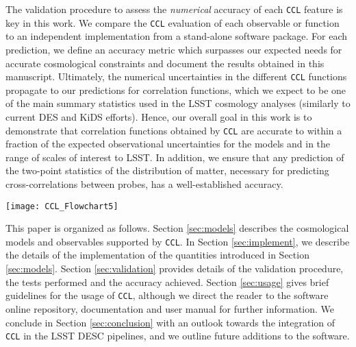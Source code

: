 \documentclass[\docopts]{\docclass}
\newcommand{\ccl}{{\tt CCL}\xspace}
\newcommand{\class}{{\tt CLASS}\xspace}
\begin{document}
The validation procedure to assess the {\it numerical} accuracy of each \ccl feature is key in this work. We compare the \ccl evaluation of each observable or function to an independent implementation from a stand-alone software package. For each prediction, we define an accuracy metric which surpasses our expected needs for accurate cosmological constraints and document the results obtained in this manuscript. Ultimately, the numerical uncertainties in the different \ccl functions propagate to our predictions for correlation functions, which we expect to be one of the main summary statistics used in the LSST cosmology analyses (similarly to current DES and KiDS efforts). Hence, our overall goal in this work is to demonstrate that correlation functions obtained by \ccl are accurate to within a fraction of the expected observational uncertainties for the models and in the range of scales of interest to LSST. In addition, we ensure that any prediction of the two-point statistics of the distribution of matter, necessary for predicting cross-correlations between probes, has a well-established accuracy.

\begin{figure*}
\centering
\texttt{[image: CCL\_Flowchart5]}
\caption{\ccl structure flowchart. \ccl is written in C with a {\tt python} interface. \ccl routines calculate basic cosmological functions such as the Hubble function, density parameters, distances and growth function. The library uses various methods to compute the matter-power spectrum, including \class, the ``Cosmic Emulator'' developed by \citet{Lawrence17}, and other common approximations. \ccl computes 2-point angular power spectra and correlation functions from various probes, including typical astrophysical systematics and accounting for user-provided or pre-coded survey specifications.}
\label{fig:CCL_structure}
\end{figure*}

This paper is organized as follows. Section \ref{sec:models} describes the cosmological models and observables supported by \ccl. In Section \ref{sec:implement}, we describe the details of the implementation of the quantities introduced in Section \ref{sec:models}. Section \ref{sec:validation} provides details of the validation procedure, the tests performed and the accuracy achieved. Section \ref{sec:usage} gives brief guidelines for the usage of \ccl, although we direct the reader to the software online repository, documentation and user manual for further information. We conclude in Section \ref{sec:conclusion} with an outlook towards the integration of \ccl in the LSST DESC pipelines, and we outline future additions to the software. 
\end{document}
